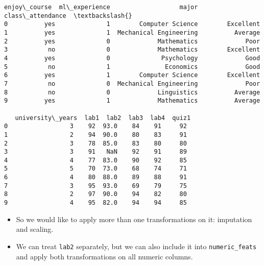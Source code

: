 \documentclass[11pt]{article}
\makeatletter
\providecommand{\tightlist}{%
      \setlength{\itemsep}{0pt}\setlength{\parskip}{0pt}}
\newcommand{\boxspacing}{\kern\kvtcb@left@rule\kern\kvtcb@boxsep}
\newcommand{\prompt}[4]{
        {\ttfamily\llap{{\color{#2}[#3]:\hspace{3pt}#4}}\vspace{-\baselineskip}}
    }
\makeatother
\begin{document}
            \begin{tcolorbox}[breakable, size=fbox, boxrule=.5pt, pad at break*=1mm, opacityfill=0]
\prompt{Out}{outcolor}{25}{\boxspacing}
\begin{Verbatim}[commandchars=\\\{\}]
  enjoy\_course  ml\_experience                   major class\_attendance  \textbackslash{}
0          yes              1        Computer Science        Excellent
1          yes              1  Mechanical Engineering          Average
2          yes              0             Mathematics             Poor
3           no              0             Mathematics        Excellent
4          yes              0              Psychology             Good
5           no              1               Economics             Good
6          yes              1        Computer Science        Excellent
7           no              0  Mechanical Engineering             Poor
8           no              0             Linguistics          Average
9          yes              1             Mathematics          Average

   university\_years  lab1  lab2  lab3  lab4  quiz1
0                 3    92  93.0    84    91     92
1                 2    94  90.0    80    83     91
2                 3    78  85.0    83    80     80
3                 3    91   NaN    92    91     89
4                 4    77  83.0    90    92     85
5                 5    70  73.0    68    74     71
6                 4    80  88.0    89    88     91
7                 3    95  93.0    69    79     75
8                 2    97  90.0    94    82     80
9                 4    95  82.0    94    94     85
\end{Verbatim}
\end{tcolorbox}
        
    \begin{itemize}
\tightlist
\item
  So we would like to apply more than one transformations on it:
  imputation and scaling.\\
\item
  We can treat \texttt{lab2} separately, but we can also include it into
  \texttt{numeric\_feats} and apply both transformations on all numeric
  columns.
\end{itemize}
\end{document}
